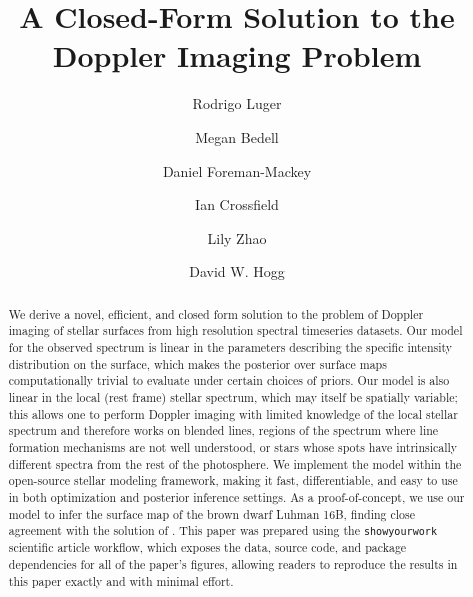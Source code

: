 \documentclass[modern]{aastex631}
\begin{document}
\title{A Closed-Form Solution to the Doppler Imaging Problem}

\author[0000-0002-0296-3826]{Rodrigo Luger}
%
\author[0000-0001-9907-7742]{Megan Bedell}
%
\author[0000-0002-9328-5652]{Daniel Foreman-Mackey}
%
\author[0000-0002-1835-1891]{Ian Crossfield}
%
\author[0000-0002-3852-3590]{Lily Zhao}
%
\author[0000-0003-2866-9403]{David W. Hogg}

\begin{abstract}
    We derive a novel, efficient, and closed form solution to the problem of Doppler imaging of stellar surfaces from high resolution spectral timeseries datasets.
    Our model for the observed spectrum is linear in the parameters describing the specific intensity distribution on the surface, which makes the posterior over surface maps computationally trivial to evaluate under certain choices of priors.
    Our model is also linear in the local (rest frame) stellar spectrum, which may itself be spatially variable; this allows one to perform Doppler imaging with limited knowledge of the local stellar spectrum and therefore works on blended lines, regions of the spectrum where line formation mechanisms are not well understood, or stars whose spots have intrinsically different spectra from the rest of the photosphere.
    We implement the model within the open-source \starry stellar modeling framework, making it fast, differentiable, and easy to use in both optimization and posterior inference settings.
    As a proof-of-concept, we use our model to infer the surface map of the brown dwarf Luhman 16B, finding close agreement with the solution of \citet{Crossfield2014}.
    This paper was prepared using the \texttt{showyourwork} scientific article workflow, which exposes the data, source code, and package dependencies for all of the paper's figures, allowing readers to reproduce the results in this paper exactly and with minimal effort.
\end{abstract}
\end{document}

